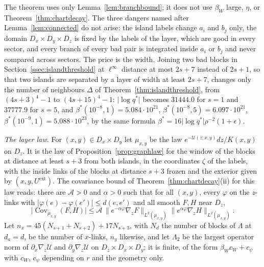 \documentclass[11pt]{amsart}
\theoremstyle{definition}
\theoremstyle{remark}
\numberwithin{equation}{section}
\newcommand{\Cov}{\operatorname{Cov}}
\begin{document}
The theorem uses only Lemma~\ref{lem:branchbound}; it does not use
$\beta_W$ large, $\eta$, or Theorem~\ref{thm:chartdecay}. The three
dangers named after Lemma~\ref{lem:connected} do not arise: the island
labels change $a_i$ and $b_j$ only, the domain $D_x\times D_y\times D_z$
is fixed by the labels of the layer, which are good in every sector, and
every branch of every bad pair is integrated inside $a_i$ or $b_j$ and
never compared across sectors. The price is the width. Joining two bad
blocks in Section~\ref{ssec:islandthreshold} at $\ell^\infty$ distance at
most $2s+7$ instead of $2s+1$, so that two islands are separated by a
layer of width at least $2s+7$, changes only the number of neighbours
$\varDelta$ of Theorem~\ref{thm:islandthreshold}, from $(4s+3)^4-1$ to
$(4s+15)^4-1$: $\lvert\log q^*\rvert$ becomes $31444.0$ for $s=1$ and
$37777.9$ for $s=5$, and $\beta^*(10^{-8},1)=5.084\cdot10^{21}$,
$\beta^*(10^{-8},5)=6.097\cdot10^{21}$,
$\beta^*(10^{-9},1)=5.088\cdot10^{23}$, by the same formula
$\beta^*=16\lvert\log q^*\rvert\rho^{-2}(1+\epsilon)$.

\emph{The layer law.} For $(x,y)\in D_x\times D_y$ let $\mu_{x,y}$
be the law $e^{-\mathcal U(z;x,y)}dz/K(x,y)$ on $D_z$. It is the law of
Proposition~\ref{prop:graphlaw} for the window of the blocks at distance
at least $s+3$ from both islands, in the coordinates $\zeta$ of the labels,
with the inside links of the blocks at distance $s+3$ frozen and the
exterior given by $(x,y,U^{\mathrm{ext}})$. The covariance bound of
Theorem~\ref{thm:chartdecay}(ii) for this law reads: there are
$\mathcal A>0$ and $\alpha>0$ such that for all $(x,y)$, every
$\varphi$ on the $z$-links with $\lvert\varphi(e)-\varphi(e')\rvert\le
d(e,e')$ and all smooth $F,H$ near $D_z$,
\begin{equation}\label{eq:layerbound}
\lvert\Cov_{\mu_{x,y}}(F,H)\rvert\le\mathcal A\,\bigl\lVert e^{-\alpha
\varphi}\nabla_zF\bigr\rVert_{L^2(\mu_{x,y})}\bigl\lVert e^{\alpha\varphi}
\nabla_zH\bigr\rVert_{L^2(\mu_{x,y})}.
\end{equation}
Let $n_x=45(N_{s+1}+N_{s+2})+17N_{s+3}$, with $N_d$ the number of blocks
of $\Lambda$ at $d_a=d$, be the number of $x$-links, $n_y$ likewise, and
let $\Lambda_2$ be the largest operator norm of $\partial_x\nabla_z
\mathcal U$ and $\partial_y\nabla_z\mathcal U$ on
$D_z\times D_x\times D_y$; it is finite, of the form $\beta_Wc_W+c_\psi$
with $c_W$, $c_\psi$ depending on $r$ and the geometry only.
\end{document}
